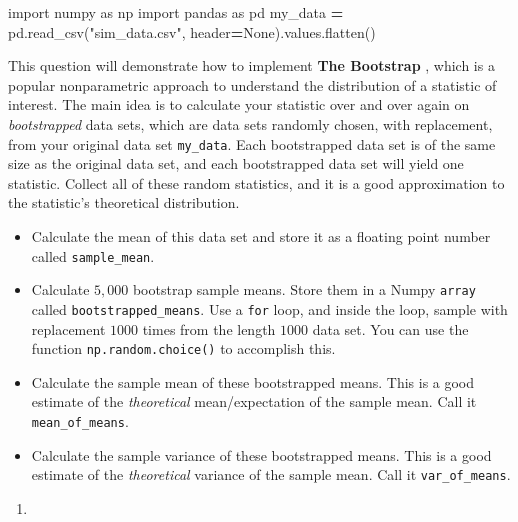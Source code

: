 \documentclass[
  12pt,
  krantz2]{krantz}
\makeatletter
\newenvironment{Shaded}{\begin{snugshade}}{\end{snugshade}}
\newcommand{\ImportTok}[1]{#1}
\newcommand{\NormalTok}[1]{#1}
\newcommand{\OperatorTok}[1]{\textcolor[rgb]{0.43,0.43,0.43}{\textbf{#1}}}
\newcommand{\StringTok}[1]{\textcolor[rgb]{0.5,0.5,0.5}{#1}}
\newcommand{\VariableTok}[1]{\textcolor[rgb]{0,0,0}{#1}}
\providecommand{\tightlist}{%
  \setlength{\itemsep}{0pt}\setlength{\parskip}{0pt}}
\newenvironment{kframe}{%
\medskip{}
\setlength{\fboxsep}{.8em}
 \def\at@end@of@kframe{}%
 \ifinner\ifhmode%
  \def\at@end@of@kframe{\end{minipage}}%
  \begin{minipage}{\columnwidth}%
 \fi\fi%
 \def\FrameCommand##1{\hskip\@totalleftmargin \hskip-\fboxsep
 \colorbox{shadecolor}{##1}\hskip-\fboxsep
     \hskip-\linewidth \hskip-\@totalleftmargin \hskip\columnwidth}%
 \MakeFramed {\advance\hsize-\width
   \@totalleftmargin\z@ \linewidth\hsize
   \@setminipage}}%
 {\par\unskip\endMakeFramed%
 \at@end@of@kframe}
\renewenvironment{Shaded}{\begin{kframe}}{\end{kframe}}
\makeatother
\begin{document}
\begin{Shaded}
\begin{Highlighting}[]
\ImportTok{import}\NormalTok{ numpy }\ImportTok{as}\NormalTok{ np}
\ImportTok{import}\NormalTok{ pandas }\ImportTok{as}\NormalTok{ pd}
\NormalTok{my\_data }\OperatorTok{=}\NormalTok{ pd.read\_csv(}\StringTok{"sim\_data.csv"}\NormalTok{, header}\OperatorTok{=}\VariableTok{None}\NormalTok{).values.flatten()}
\end{Highlighting}
\end{Shaded}

This question will demonstrate how to implement \textbf{The Bootstrap} \citep{bootstrap}, which is a popular nonparametric approach to understand the distribution of a statistic of interest. The main idea is to calculate your statistic over and over again on \emph{bootstrapped} data sets, which are data sets randomly chosen, with replacement, from your original data set \texttt{my\_data}. Each bootstrapped data set is of the same size as the original data set, and each bootstrapped data set will yield one statistic. Collect all of these random statistics, and it is a good approximation to the statistic's theoretical distribution.

\begin{itemize}
\tightlist
\item
  Calculate the mean of this data set and store it as a floating point number called \texttt{sample\_mean}.
\item
  Calculate \(5,000\) bootstrap sample means. Store them in a Numpy \texttt{array} called \texttt{bootstrapped\_means}. Use a \texttt{for} loop, and inside the loop, sample with replacement \(1000\) times from the length \(1000\) data set. You can use the function \texttt{np.random.choice()} to accomplish this.
\item
  Calculate the sample mean of these bootstrapped means. This is a good estimate of the \emph{theoretical} mean/expectation of the sample mean. Call it \texttt{mean\_of\_means}.
\item
  Calculate the sample variance of these bootstrapped means. This is a good estimate of the \emph{theoretical} variance of the sample mean. Call it \texttt{var\_of\_means}.
\end{itemize}

\begin{enumerate}
\def\labelenumi{\arabic{enumi}.}
\setcounter{enumi}{2}
\tightlist
\item
\end{enumerate}
\end{document}
